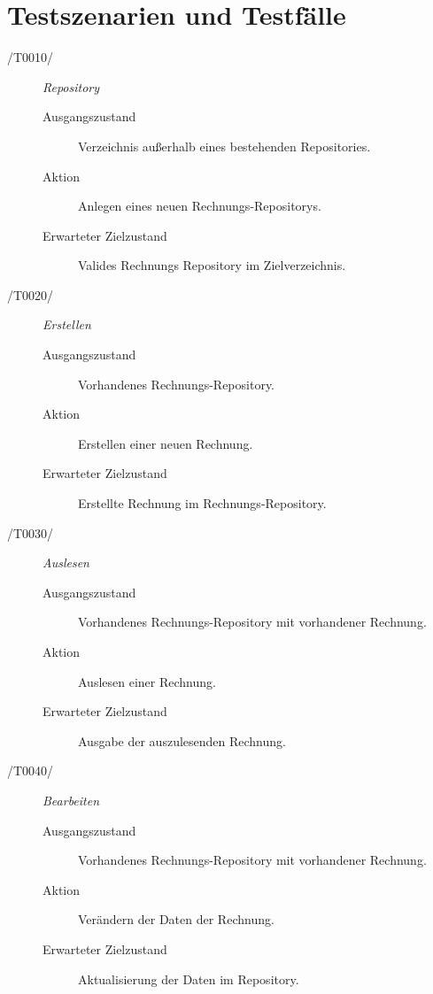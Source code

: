 
\section{Testszenarien und Testfälle}



\begin{description}
  \item[/T0010/]
    \textit{Repository}
    \begin{description}
    	\item[Ausgangszustand]
    	Verzeichnis außerhalb eines bestehenden Repositories.
    	\item[Aktion]
    	Anlegen eines neuen Rechnungs-Repositorys.
    	\item[Erwarteter Zielzustand]
    	Valides Rechnungs Repository im Zielverzeichnis.
    \end{description}

  \item[/T0020/]
    \textit{Erstellen}
    \begin{description}
    	\item[Ausgangszustand]
    	Vorhandenes Rechnungs-Repository.
    	\item[Aktion]
    	Erstellen einer neuen Rechnung.
    	\item[Erwarteter Zielzustand]
    	Erstellte Rechnung im Rechnungs-Repository.
    \end{description}

  \item[/T0030/]
    \textit{Auslesen}
    \begin{description}
    	\item[Ausgangszustand]
    	Vorhandenes Rechnungs-Repository mit vorhandener Rechnung.
    	\item[Aktion]
    	Auslesen einer Rechnung.
    	\item[Erwarteter Zielzustand]
    	Ausgabe der auszulesenden Rechnung.
    \end{description}

  \item[/T0040/]
    \textit{Bearbeiten}
    \begin{description}
    	\item[Ausgangszustand]
    	Vorhandenes Rechnungs-Repository mit vorhandener Rechnung.
    	\item[Aktion]
    	Verändern der Daten der Rechnung.
    	\item[Erwarteter Zielzustand]
    	Aktualisierung der Daten im Repository.
    \end{description}


\end{description}
